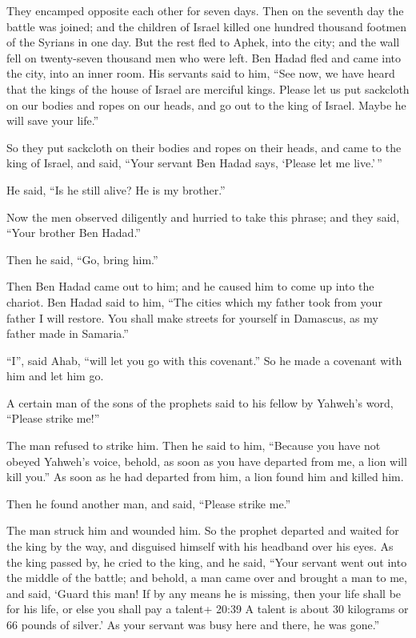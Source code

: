  They encamped opposite each other for seven days. Then on
the seventh day the battle was joined; and the children of Israel killed
one hundred thousand footmen of the Syrians in one day. 
But the rest fled to Aphek, into the city; and the wall fell on
twenty-seven thousand men who were left. Ben Hadad fled and came into
the city, into an inner room.  His servants said to him,
``See now, we have heard that the kings of the house of Israel are
merciful kings. Please let us put sackcloth on our bodies and ropes on
our heads, and go out to the king of Israel. Maybe he will save your
life.''

 So they put sackcloth on their bodies and ropes on their
heads, and came to the king of Israel, and said, ``Your servant Ben
Hadad says, `Please let me live.'\,''

He said, ``Is he still alive? He is my brother.''

 Now the men observed diligently and hurried to take this
phrase; and they said, ``Your brother Ben Hadad.''

Then he said, ``Go, bring him.''

Then Ben Hadad came out to him; and he caused him to come up into the
chariot.  Ben Hadad said to him, ``The cities which my
father took from your father I will restore. You shall make streets for
yourself in Damascus, as my father made in Samaria.''

``I'', said Ahab, ``will let you go with this covenant.'' So he made a
covenant with him and let him go.

 A certain man of the sons of the prophets said to his
fellow by Yahweh's word, ``Please strike me!''

The man refused to strike him.  Then he said to him,
``Because you have not obeyed Yahweh's voice, behold, as soon as you
have departed from me, a lion will kill you.'' As soon as he had
departed from him, a lion found him and killed him.

 Then he found another man, and said, ``Please strike me.''

The man struck him and wounded him.  So the prophet
departed and waited for the king by the way, and disguised himself with
his headband over his eyes.  As the king passed by, he
cried to the king, and he said, ``Your servant went out into the middle
of the battle; and behold, a man came over and brought a man to me, and
said, `Guard this man! If by any means he is missing, then your life
shall be for his life, or else you shall pay a talent+ 20:39 A talent is
about 30 kilograms or 66 pounds of silver.'  As your
servant was busy here and there, he was gone.''

